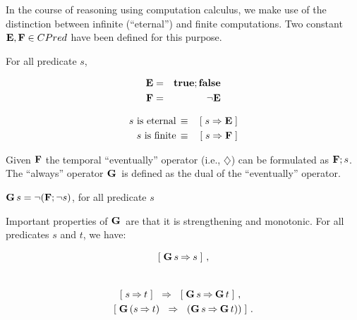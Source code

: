 In the course of reasoning using computation calculus, we make use of
the distinction between infinite (``eternal'') and finite
computations.  Two constant $\mathbf{E}, \mathbf{F} \in CPred$ have been defined for
this purpose. 
\begin{Definition} For all predicate $s$,\\
  \begin{minipage}{0.4\linewidth}
    \begin{eqnarray}
      \mathbf{E} & = & \mathbf{true};\mathbf{false} \label{eq:comp-eternal} \\
      \mathbf{F} & = & \neg \mathbf{E} \label{eq:comp-finite}
    \end{eqnarray}
  \end{minipage}
  \hfill
  \begin{minipage}{0.4\linewidth}
    \begin{eqnarray}
      \textrm{$s$ is eternal} & \, \equiv \, & [\; s \Rightarrow \mathbf{E} \;] \label{eq:comp-s-eternal} \\
      \textrm{$s$ is finite} & \, \equiv\, & [\; s \Rightarrow \mathbf{F} \;] \label{eq:comp-s-finite}
    \end{eqnarray}
  \end{minipage}
\end{Definition}
Given $\mathbf{F}$ the temporal ``eventually'' operator (i.e., $\diamondsuit$)
can be formulated as $\mathbf{F};s$.  The ``always'' operator $\mathbf{G}\,$ is defined
as the dual of the ``eventually'' operator.
\begin{Definition}
  $\mathbf{G}\, s = \neg(\mathbf{F};\neg s)$, for all predicate $s$
\end{Definition}
Important properties of $\mathbf{G}\,$ are that it is strengthening and
monotonic.  For all predicates $s$ and $t$, we have:

  \begin{minipage}{0.3\linewidth}
	\begin{align}
	  \label{eq:g-strengthen}
	  [\; \mathbf{G}\, s \mathbin\Rightarrow s \;]~, \\
	  \nonumber
	\end{align}
  \end{minipage}
  \hfill
  \begin{minipage}{0.5\linewidth}
    \begin{align}
      \label{eq:g-monotonic}
      \ew{s \limp t} \Wide{&\limp} \ew{\G s \limp \G t}~, \\ 
	\ew{ \G (s \limp t) &\Wide{\limp} (\G s \limp \G t)  ) }~.
    \end{align}
  \end{minipage}

